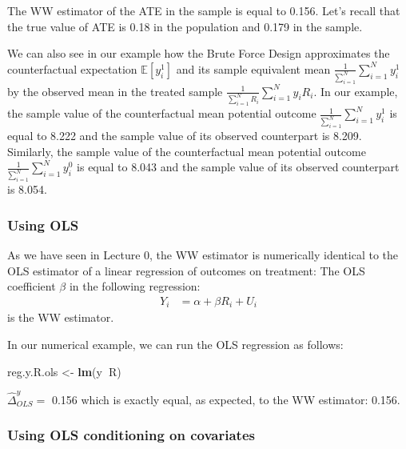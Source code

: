 \documentclass[]{book}
\newenvironment{Shaded}{\begin{snugshade}}{\end{snugshade}}
\newcommand{\KeywordTok}[1]{\textcolor[rgb]{0.13,0.29,0.53}{\textbf{#1}}}
\newcommand{\NormalTok}[1]{#1}
\newcommand{\OperatorTok}[1]{\textcolor[rgb]{0.81,0.36,0.00}{\textbf{#1}}}
\newcommand{\StringTok}[1]{\textcolor[rgb]{0.31,0.60,0.02}{#1}}
\newcommand{\esp}[1]{\mathbb{E}[ #1 ]}
\theoremstyle{definition}
\theoremstyle{definition}
\theoremstyle{definition}
\theoremstyle{remark}
\let\BeginKnitrBlock\begin \let\EndKnitrBlock\end
\begin{document}
The WW estimator of the ATE in the sample is equal to 0.156.
Let's recall that the true value of ATE is 0.18 in the population and 0.179 in the sample.

We can also see in our example how the Brute Force Design approximates the counterfactual expectation \(\esp{y_i^1}\) and its sample equivalent mean \(\frac{1}{\sum_{i=1}^N}\sum_{i=1}^N y^1_i\) by the observed mean in the treated sample \(\frac{1}{\sum_{i=1}^N R_i}\sum_{i=1}^N y_iR_i\).
In our example, the sample value of the counterfactual mean potential outcome \(\frac{1}{\sum_{i=1}^N}\sum_{i=1}^N y^1_i\) is equal to 8.222 and the sample value of its observed counterpart is 8.209.
Similarly, the sample value of the counterfactual mean potential outcome \(\frac{1}{\sum_{i=1}^N}\sum_{i=1}^N y^0_i\) is equal to 8.043 and the sample value of its observed counterpart is 8.054.

\hypertarget{using-ols}{%
\subsubsection{Using OLS}\label{using-ols}}

As we have seen in Lecture 0, the WW estimator is numerically identical to the OLS estimator of a linear regression of outcomes on treatment:
The OLS coefficient \(\beta\) in the following regression:
\begin{align*}
    Y_i &  = \alpha +  \beta R_i + U_i
    \end{align*}
is the WW estimator.

\BeginKnitrBlock{example}
\protect\hypertarget{exm:unnamed-chunk-71}{}{\label{exm:unnamed-chunk-71} }In our numerical example, we can run the OLS regression as follows:
\EndKnitrBlock{example}

\begin{Shaded}
\begin{Highlighting}[]
\NormalTok{reg.y.R.ols <-}\StringTok{ }\KeywordTok{lm}\NormalTok{(y}\OperatorTok{~}\NormalTok{R)}
\end{Highlighting}
\end{Shaded}

\(\hat{\Delta}^y_{OLS}=\) 0.156 which is exactly equal, as expected, to the WW estimator: 0.156.

\hypertarget{using-ols-conditioning-on-covariates}{%
\subsubsection{Using OLS conditioning on covariates}\label{using-ols-conditioning-on-covariates}}
\end{document}
